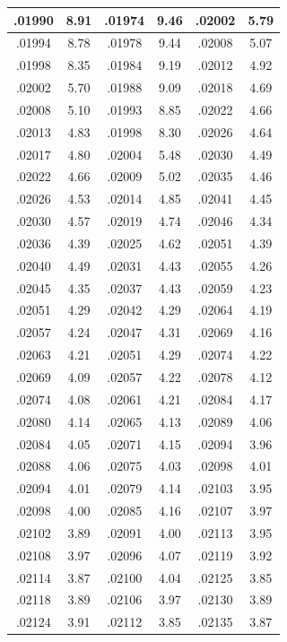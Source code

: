 \documentclass[10pt,twoside]{report}
\begin{document}
\begin{appendices}
\begin{longtable}{|c|c||c|c||c|c|}
.01990 & 8.91 & .01974 & 9.46 & .02002 & 5.79\\\hline
.01994 & 8.78 & .01978 & 9.44 & .02008 & 5.07\\\hline
.01998 & 8.35 & .01984 & 9.19 & .02012 & 4.92\\\hline
.02002 & 5.70 & .01988 & 9.09 & .02018 & 4.69\\\hline
.02008 & 5.10 & .01993 & 8.85 & .02022 & 4.66\\\hline
.02013 & 4.83 & .01998 & 8.30 & .02026 & 4.64\\\hline
.02017 & 4.80 & .02004 & 5.48 & .02030 & 4.49\\\hline
.02022 & 4.66 & .02009 & 5.02 & .02035 & 4.46\\\hline
.02026 & 4.53 & .02014 & 4.85 & .02041 & 4.45\\\hline
.02030 & 4.57 & .02019 & 4.74 & .02046 & 4.34\\\hline
.02036 & 4.39 & .02025 & 4.62 & .02051 & 4.39\\\hline
.02040 & 4.49 & .02031 & 4.43 & .02055 & 4.26\\\hline
.02045 & 4.35 & .02037 & 4.43 & .02059 & 4.23\\\hline
.02051 & 4.29 & .02042 & 4.29 & .02064 & 4.19\\\hline
.02057 & 4.24 & .02047 & 4.31 & .02069 & 4.16\\\hline
.02063 & 4.21 & .02051 & 4.29 & .02074 & 4.22\\\hline
.02069 & 4.09 & .02057 & 4.22 & .02078 & 4.12\\\hline
.02074 & 4.08 & .02061 & 4.21 & .02084 & 4.17\\\hline
.02080 & 4.14 & .02065 & 4.13 & .02089 & 4.06\\\hline
.02084 & 4.05 & .02071 & 4.15 & .02094 & 3.96\\\hline
.02088 & 4.06 & .02075 & 4.03 & .02098 & 4.01\\\hline
.02094 & 4.01 & .02079 & 4.14 & .02103 & 3.95\\\hline
.02098 & 4.00 & .02085 & 4.16 & .02107 & 3.97\\\hline
.02102 & 3.89 & .02091 & 4.00 & .02113 & 3.95\\\hline
.02108 & 3.97 & .02096 & 4.07 & .02119 & 3.92\\\hline
.02114 & 3.87 & .02100 & 4.04 & .02125 & 3.85\\\hline
.02118 & 3.89 & .02106 & 3.97 & .02130 & 3.89\\\hline
.02124 & 3.91 & .02112 & 3.85 & .02135 & 3.87\\\hline

\end{longtable}
\end{appendices}
\end{document}
